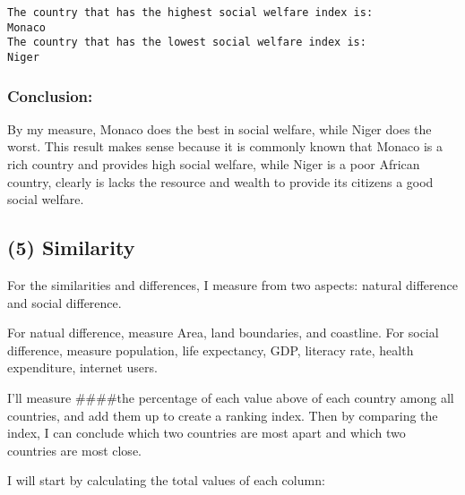 \documentclass{article}
\begin{document}
    \begin{Verbatim}[commandchars=\\\{\}]
The country that has the highest social welfare index is:
Monaco
The country that has the lowest social welfare index is:
Niger
    \end{Verbatim}

    \subsubsection{Conclusion:}\label{conclusion}

By my measure, Monaco does the best in social welfare, while Niger does
the worst. This result makes sense because it is commonly known that
Monaco is a rich country and provides high social welfare, while Niger
is a poor African country, clearly is lacks the resource and wealth to
provide its citizens a good social welfare.

    \subsection{(5) Similarity}\label{similarity}

    For the similarities and differences, I measure from two aspects:
natural difference and social difference.

For natual difference, measure Area, land boundaries, and coastline. For
social difference, measure population, life expectancy, GDP, literacy
rate, health expenditure, internet users.

I'll measure \#\#\#\#the percentage of each value above of each country
among all countries, and add them up to create a ranking index. Then by
comparing the index, I can conclude which two countries are most apart
and which two countries are most close.

I will start by calculating the total values of each column:
\end{document}
